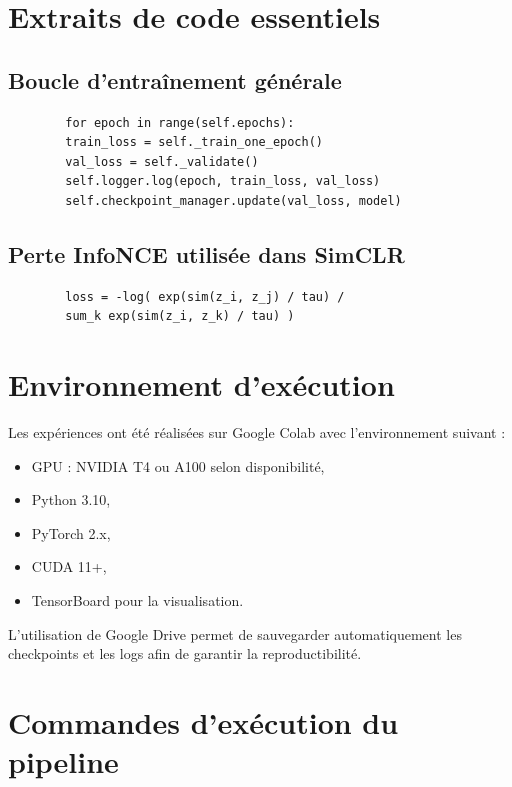 \documentclass[12pt,a4paper]{report}
\begin{document}
	\section{Extraits de code essentiels}
	
	\subsection*{Boucle d'entraînement générale}
	
	\begin{verbatim}
		for epoch in range(self.epochs):
		train_loss = self._train_one_epoch()
		val_loss = self._validate()
		self.logger.log(epoch, train_loss, val_loss)
		self.checkpoint_manager.update(val_loss, model)
	\end{verbatim}
	
	\subsection*{Perte InfoNCE utilisée dans SimCLR}
	
	\begin{verbatim}
		loss = -log( exp(sim(z_i, z_j) / tau) /
		sum_k exp(sim(z_i, z_k) / tau) )
	\end{verbatim}
	
	\section{Environnement d'exécution}
	
	Les expériences ont été réalisées sur Google Colab avec l’environnement suivant :
	
	\begin{itemize}
		\item GPU : NVIDIA T4 ou A100 selon disponibilité,
		\item Python 3.10,
		\item PyTorch 2.x,
		\item CUDA 11+,
		\item TensorBoard pour la visualisation.
	\end{itemize}
	
	L’utilisation de Google Drive permet de sauvegarder automatiquement les checkpoints et les logs afin de garantir la reproductibilité.
	
	\section{Commandes d'exécution du pipeline}
	
\end{document}

